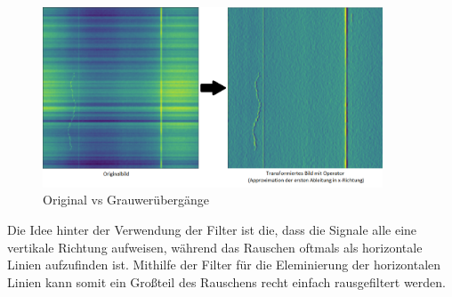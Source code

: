 \documentclass[12pt, a4paper]{article}
\begin{document}
\begin{figure}[t]
\centering
\includegraphics[width=0.9\textwidth]{img/original-vs-cv.png}
\caption{Original vs Grauwerübergänge}
\label{fig:ableitung}
\end{figure}

Die Idee hinter der Verwendung der Filter ist die, dass die Signale alle eine vertikale Richtung aufweisen, während das Rauschen oftmals als horizontale Linien aufzufinden ist. Mithilfe der Filter für die Eleminierung der horizontalen Linien kann somit ein Großteil des Rauschens recht einfach rausgefiltert werden.
\end{document}
